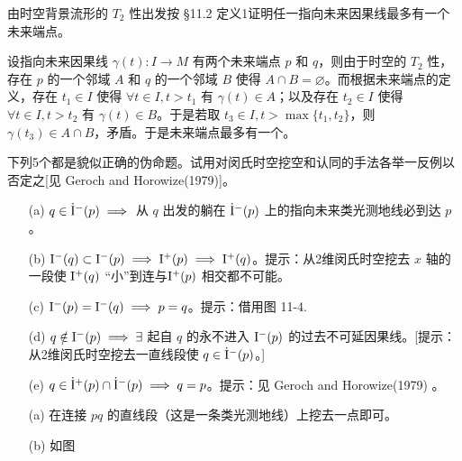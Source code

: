 \begin{xiti}
    \item 由时空背景流形的 $T_2$ 性出发按 \S 11.2 定义1证明任一指向未来因果线最多有一个未来端点。

    \begin{zm}
        设指向未来因果线 $\gamma(t) \colon I \rightarrow M$ 有两个未来端点 $p$ 和 $q$，则由于时空的 $T_2$ 性，存在 $p$ 的一个邻域 $A$ 和 $q$ 的一个邻域 $B$ 使得 $A\cap B = \varnothing$。而根据未来端点的定义，存在 $t_1 \in I$ 使得 $\forall t \in I,t > t_1$ 有 $\gamma(t) \in A$；以及存在 $t_2 \in I$ 使得 $\forall t \in I,t > t_2$ 有 $\gamma(t) \in B$。于是若取 $t_3 \in I , t>\max\{t_1,t_2\}$，则 $\gamma(t_3)\in A \cap B$，矛盾。于是未来端点最多有一个。
    \end{zm}

    \item 下列5个都是貌似正确的伪命题。试用对闵氏时空挖空和认同的手法各举一反例以否定之[见 Geroch and Horowize(1979)]。
    \begin{enumerate}
        \item[(a)] $q\in \dot{\mathrm{I}}^-(p) \implies $ 从 $q$ 出发的躺在 $\dot{\mathrm{I}}^-(p)$ 上的指向未来类光测地线必到达 $p$。
        \item[(b)] $\mathrm{I}^-(q) \subset \mathrm{I}^-(p) \implies \mathrm{I}^+(p) \implies \mathrm{I}^+(q) $。提示：从2维闵氏时空挖去 $x$ 轴的一段使 $\mathrm{I}^+(q)$ “小”到连与$\mathrm{I}^+(p)$ 相交都不可能。
        \item[(c)] $\mathrm{I}^-(p) = \mathrm{I}^-(q) \implies p = q$。提示：借用图 11-4.
        \item[(d)] $q \notin \mathrm{I}^-(p) \implies \exists $ 起自 $q$ 的永不进入 $\mathrm{I}^-(p)$ 的过去不可延因果线。[提示：从2维闵氏时空挖去一直线段使 $q \in \dot{\mathrm{I}}^-(p)$。]
        \item[(e)] $q \in \dot{\mathrm{I}}^+(p) \cap \dot{\mathrm{I}}^-(p) \implies q=p$。提示：见 Geroch and Horowize(1979) 。
    \end{enumerate}

    \begin{jie}
        \begin{enumerate}
            \item[(a)] 在连接 $pq$ 的直线段（这是一条类光测地线）上挖去一点即可。
            \item[(b)] 如图
        \end{enumerate}
    \end{jie}
\end{xiti}
